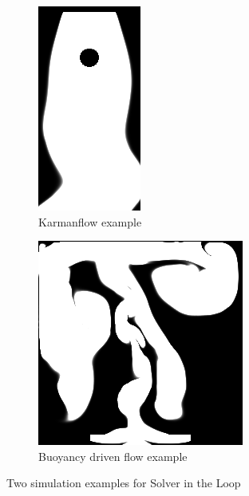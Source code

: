 \documentclass[a4paper,12pt,twoside]{report}
\begin{document}
\begin{figure}
\centering
\begin{subfigure}{0.4\textwidth}
  \centering
  \includegraphics[scale=0.5]{karmanflow.png}
  \caption{Karmanflow example}
\end{subfigure}
\begin{subfigure}{0.4\textwidth}
  \centering
  \includegraphics[scale=0.5]{buoyancy.png}
  \caption{Buoyancy driven flow example}
\end{subfigure}
\caption{Two simulation examples for Solver in the Loop}
\end{figure}
\end{document}
